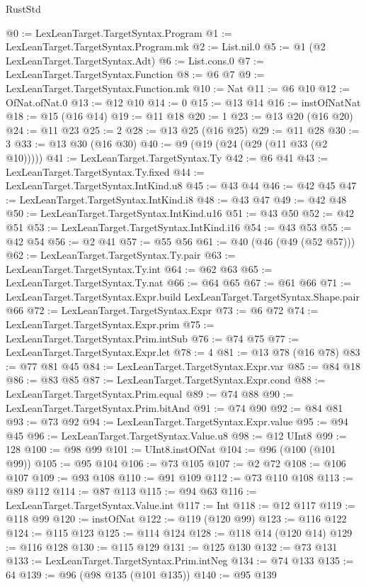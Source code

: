 \begin{lexlean}{RustStd}
\begin{coremodule}
@0 := LexLeanTarget.TargetSyntax.Program
@1 := LexLeanTarget.TargetSyntax.Program.mk
@2 := List.nil.{0}
@5 := @1 (@2 LexLeanTarget.TargetSyntax.Adt)
@6 := List.cons.{0}
@7 := LexLeanTarget.TargetSyntax.Function
@8 := @6 @7
@9 := LexLeanTarget.TargetSyntax.Function.mk
@10 := Nat
@11 := @6 @10
@12 := OfNat.ofNat.{0}
@13 := @12 @10
@14 := 0
@15 := @13 @14
@16 := instOfNatNat
@18 := @15 (@16 @14)
@19 := @11 @18
@20 := 1
@23 := @13 @20 (@16 @20)
@24 := @11 @23
@25 := 2
@28 := @13 @25 (@16 @25)
@29 := @11 @28
@30 := 3
@33 := @13 @30 (@16 @30)
@40 := @9 (@19 (@24 (@29 (@11 @33 (@2 @10)))))
@41 := LexLeanTarget.TargetSyntax.Ty
@42 := @6 @41
@43 := LexLeanTarget.TargetSyntax.Ty.fixed
@44 := LexLeanTarget.TargetSyntax.IntKind.u8
@45 := @43 @44
@46 := @42 @45
@47 := LexLeanTarget.TargetSyntax.IntKind.i8
@48 := @43 @47
@49 := @42 @48
@50 := LexLeanTarget.TargetSyntax.IntKind.u16
@51 := @43 @50
@52 := @42 @51
@53 := LexLeanTarget.TargetSyntax.IntKind.i16
@54 := @43 @53
@55 := @42 @54
@56 := @2 @41
@57 := @55 @56
@61 := @40 (@46 (@49 (@52 @57)))
@62 := LexLeanTarget.TargetSyntax.Ty.pair
@63 := LexLeanTarget.TargetSyntax.Ty.int
@64 := @62 @63
@65 := LexLeanTarget.TargetSyntax.Ty.nat
@66 := @64 @65
@67 := @61 @66
@71 := LexLeanTarget.TargetSyntax.Expr.build LexLeanTarget.TargetSyntax.Shape.pair @66
@72 := LexLeanTarget.TargetSyntax.Expr
@73 := @6 @72
@74 := LexLeanTarget.TargetSyntax.Expr.prim
@75 := LexLeanTarget.TargetSyntax.Prim.intSub
@76 := @74 @75
@77 := LexLeanTarget.TargetSyntax.Expr.let
@78 := 4
@81 := @13 @78 (@16 @78)
@83 := @77 @81 @45
@84 := LexLeanTarget.TargetSyntax.Expr.var
@85 := @84 @18
@86 := @83 @85
@87 := LexLeanTarget.TargetSyntax.Expr.cond
@88 := LexLeanTarget.TargetSyntax.Prim.equal
@89 := @74 @88
@90 := LexLeanTarget.TargetSyntax.Prim.bitAnd
@91 := @74 @90
@92 := @84 @81
@93 := @73 @92
@94 := LexLeanTarget.TargetSyntax.Expr.value
@95 := @94 @45
@96 := LexLeanTarget.TargetSyntax.Value.u8
@98 := @12 UInt8
@99 := 128
@100 := @98 @99
@101 := UInt8.instOfNat
@104 := @96 (@100 (@101 @99))
@105 := @95 @104
@106 := @73 @105
@107 := @2 @72
@108 := @106 @107
@109 := @93 @108
@110 := @91 @109
@112 := @73 @110 @108
@113 := @89 @112
@114 := @87 @113
@115 := @94 @63
@116 := LexLeanTarget.TargetSyntax.Value.int
@117 := Int
@118 := @12 @117
@119 := @118 @99
@120 := instOfNat
@122 := @119 (@120 @99)
@123 := @116 @122
@124 := @115 @123
@125 := @114 @124
@128 := @118 @14 (@120 @14)
@129 := @116 @128
@130 := @115 @129
@131 := @125 @130
@132 := @73 @131
@133 := LexLeanTarget.TargetSyntax.Prim.intNeg
@134 := @74 @133
@135 := 64
@139 := @96 (@98 @135 (@101 @135))
@140 := @95 @139

\end{coremodule}
\end{lexlean}
